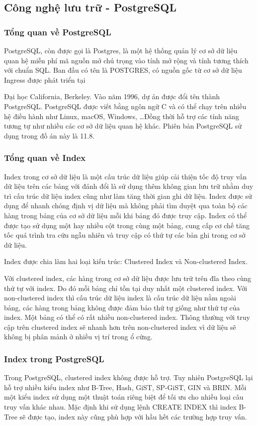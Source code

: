 \subsection{Công nghệ lưu trữ - PostgreSQL}

\subsubsection{Tổng quan về PostgreSQL}
PostgreSQL, còn được gọi là Postgres, là một hệ thống quản lý cơ sở 
dữ liệu quan hệ miễn phí mã nguồn mở chú trọng vào tính mở rộng và 
tính tương thích với chuẩn SQL. Ban đầu có tên là POSTGRES, có nguồn
gốc từ cơ sở dữ liệu Ingress được phát triển tại

Đại học California, Berkeley. Vào năm 1996, dự án được đổi tên thành
PostgreSQL. PostgreSQL được viết bằng ngôn ngữ C và có thể chạy trên nhiều
hệ điều hành như Linux, macOS, Windows, \ldots Đồng thời hỗ trợ các tính
năng tương tự như nhiều các cơ sở dữ liệu quan hệ khác.
Phiên bản PostgreSQL sử dụng trong đồ án này là 11.8.

\subsubsection{Tổng quan về Index}
Index trong cơ sở dữ liệu là một cấu trúc dữ liệu giúp cải thiện
tốc độ truy vấn dữ liệu trên các bảng với đánh đổi là sử dụng thêm
không gian lưu trữ nhằm duy trì cấu trúc dữ liệu index cũng như
làm tăng thời gian ghi dữ liệu. Index được sử dụng để nhanh chóng
định vị dữ liệu mà không phải tìm duyệt qua toàn bộ các hàng trong
bảng của cơ sở dữ liệu mỗi khi bảng đó được truy cập. Index có thể
được tạo sử dụng một hay nhiều cột trong cùng một bảng, cung cấp
cơ chế tăng tốc quá trình tra cứu ngẫu nhiên và truy cập có thứ
tự các bản ghi trong cơ sở dữ liệu. 

Index được chia làm hai loại kiến trúc:
Clustered Index và Non-clustered Index.

Với clustered index, các hàng trong cơ sở dữ liệu được lưu trữ
trên đĩa theo cùng thứ tự với index. Do đó mỗi bảng chỉ tồn tại
duy nhất một clustered index. Với non-clustered index thì cấu trúc dữ
liệu index là cấu trúc dữ liệu nằm ngoài bảng, các hàng trong bảng
không được đảm bảo thứ tự giống như thứ tự của index. Một bảng có
thể có rất nhiều non-clustered index. Thông thường với truy cập trên
clustered index sẽ nhanh hơn trên non-clustered index vì dữ liệu
sẽ không bị phân mảnh ở nhiều vị trí trong ổ cứng.

\subsubsection{Index trong PostgreSQL}
Trong PostgreSQL, clustered index không được hỗ trợ. Tuy nhiên
PostgreSQL lại hỗ trợ nhiều kiểu index như B-Tree, Hash, GiST,
SP-GiST, GIN và BRIN. Mỗi một kiểu index sử dụng một thuật toán
riêng biệt để tối ưu cho nhiều loại câu truy vấn khác nhau.
Mặc định khi sử dụng lệnh CREATE INDEX thì index B-Tree sẽ được tạo,
index này cũng phù hợp với hầu hết các trường hợp truy vấn. 

